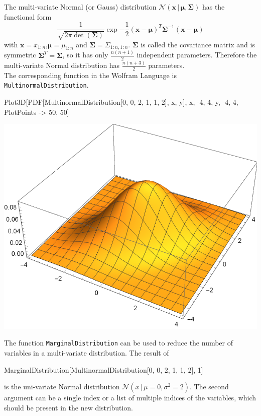\documentclass{tstextbook}
\begin{document}
\begin{example}
  The multi-variate Normal (or Gauss) distribution
  $\mathcal{N}\left(\mathbf{x}\,\vert\,\boldsymbol{\mu},\boldsymbol{\Sigma}\right)$ has the functional form
  \begin{equation}
    \frac{1}{\sqrt{2\pi \det(\boldsymbol{\Sigma})}}\exp{-\frac{1}{2}(\mathbf{x}-\boldsymbol{\mu})^T\boldsymbol{\Sigma}^{-1}(\mathbf{x}-\boldsymbol{\mu})}
  \end{equation}
with $\mathbf{x}=x_{1:n}$,$\boldsymbol{\mu}=\mu_{1:n}$ and $\boldsymbol{\Sigma}=\Sigma_{1:n,1:n}$. $\boldsymbol{\Sigma}$ is called the covariance matrix and is symmetric $\boldsymbol{\Sigma}^T=\boldsymbol{\Sigma}$, so it has only $\frac{n(n+1)}{2}$ independent parameters. Therefore the multi-variate Normal distribution has $\frac{n(n+3)}{2}$ parameters.\\

The corresponding function in the Wolfram Language is \texttt{MultinormalDistribution}. \begin{mathematica}
Plot3D[PDF[MultinormalDistribution[{0, 0}, {{2, 1}, {1, 2}}], {x, y}],
       {x, -4, 4}, {y, -4, 4}, PlotPoints -> {50, 50}]
\end{mathematica}
\includegraphics[scale=0.8, center]{images/multi_normal_distribution.pdf}

The function \texttt{MarginalDistribution} can be used to reduce the number of variables in a multi-variate distribution. The result of
\begin{mathematica}
MarginalDistribution[MultinormalDistribution[{0, 0}, {{2, 1}, {1, 2}}], 1]
\end{mathematica}
is the uni-variate Normal distribution $\mathcal{N}\left(x\,\vert\,\mu=0,\sigma^2=2\right)$. The second argument can be a single index or a list of multiple indices of the variables, which should be present in the new distribution.   
\end{example}
\end{document}
